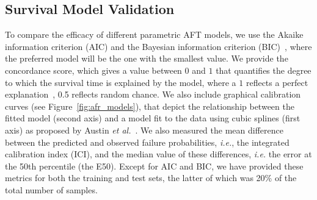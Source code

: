 






\subsection{Survival Model Validation}
\label{metrics}

To compare the efficacy of different parametric AFT models, we use the Akaike information criterion (AIC) and the Bayesian information criterion (BIC)~\cite{stoica2004model,taddy2019business}, where the preferred model will be the one with the smallest value. We provide the
concordance score, which gives a value between $0$ and $1$ that quantifies the degree to which the survival time is explained by the model, where a $1$ reflects a perfect explanation~\cite{kleinbaum1996survival}, 0.5 reflects random chance. We also include graphical calibration curves (see Figure~\ref{fig:afr_models}), that depict the relationship between the fitted model (second axis) and a model fit to the data using cubic splines (first axis) as proposed by Austin \textit{et al.}~\cite{ici}. We also measured the mean difference between the predicted and observed failure probabilities, \textit{i.e.}, the integrated calibration index (ICI), and the median value of these differences, \textit{i.e.} the error at the 50th percentile (the E50). Except for AIC and BIC, we have provided these metrics for both the training and test sets, the latter of which was 20\% of the total number of samples.



